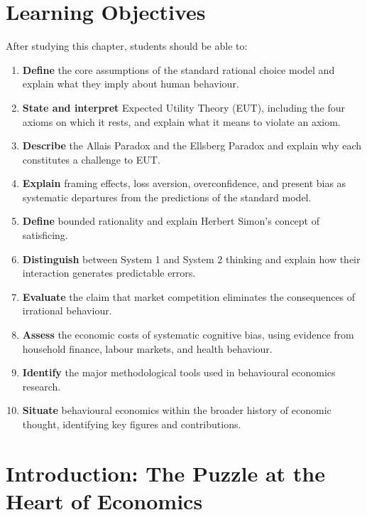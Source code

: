 \documentclass[12pt, letterpaper]{article}
\begin{document}
\medskip
\newpage

\section*{Learning Objectives}


After studying this chapter, students should be able to:

\begin{enumerate}
\item \textbf{Define} the core assumptions of the standard rational choice model and explain what they imply about human behaviour.
\item \textbf{State and interpret} Expected Utility Theory (EUT), including the four axioms on which it rests, and explain what it means to violate an axiom.
\item \textbf{Describe} the Allais Paradox and the Ellsberg Paradox and explain why each constitutes a challenge to EUT.
\item \textbf{Explain} framing effects, loss aversion, overconfidence, and present bias as systematic departures from the predictions of the standard model.
\item \textbf{Define} bounded rationality and explain Herbert Simon's concept of satisficing.
\item \textbf{Distinguish} between System 1 and System 2 thinking and explain how their interaction generates predictable errors.
\item \textbf{Evaluate} the claim that market competition eliminates the consequences of irrational behaviour.
\item \textbf{Assess} the economic costs of systematic cognitive bias, using evidence from household finance, labour markets, and health behaviour.
\item \textbf{Identify} the major methodological tools used in behavioural economics research.
\item \textbf{Situate} behavioural economics within the broader history of economic thought, identifying key figures and contributions.
\end{enumerate}

\medskip

\newpage
\section*{Introduction: The Puzzle at the Heart of Economics}
\end{document}
